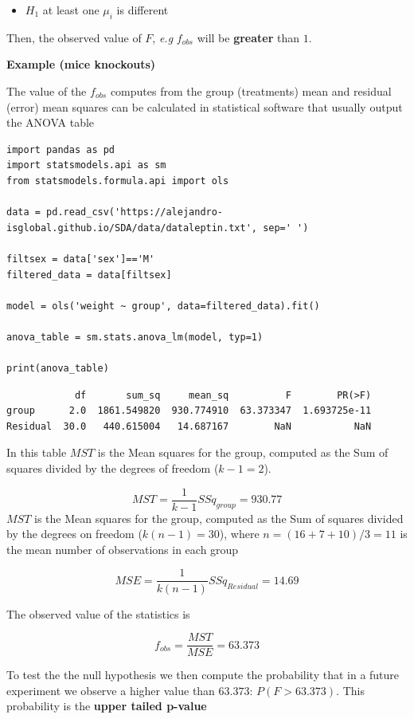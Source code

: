 \documentclass[
]{book}
\providecommand{\tightlist}{%
  \setlength{\itemsep}{0pt}\setlength{\parskip}{0pt}}
\begin{document}
\begin{itemize}
\tightlist
\item
  \(H_1\) at least one \(\mu_i\) is different
\end{itemize}

Then, the observed value of \(F\), \emph{e.g} \(f_{obs}\) will be \textbf{greater} than \(1\).

\textbf{Example (mice knockouts)}

The value of the \(f_{obs}\) computes from the group (treatments) mean and residual (error) mean squares can be calculated in statistical software that usually output the ANOVA table

\begin{verbatim}
import pandas as pd
import statsmodels.api as sm
from statsmodels.formula.api import ols

data = pd.read_csv('https://alejandro-isglobal.github.io/SDA/data/dataleptin.txt', sep=' ')

filtsex = data['sex']=='M'
filtered_data = data[filtsex]

model = ols('weight ~ group', data=filtered_data).fit()

anova_table = sm.stats.anova_lm(model, typ=1)

print(anova_table)
\end{verbatim}

\begin{verbatim}
            df       sum_sq     mean_sq          F        PR(>F)
group      2.0  1861.549820  930.774910  63.373347  1.693725e-11
Residual  30.0   440.615004   14.687167        NaN           NaN
\end{verbatim}

In this table \(MST\) is the Mean squares for the group, computed as the Sum of squares divided by the degrees of freedom (\(k-1=2\)).

\[MST=\frac{1}{k-1}SSq_{group}=930.77\]
\(MST\) is the Mean squares for the group, computed as the Sum of squares divided by the degrees on freedom (\(k(n-1)=30\)), where \(n=(16 + 7 + 10)/3=11\) is the mean number of observations in each group

\[MSE=\frac{1}{k(n-1)}SSq_{Residual}=14.69\]

The observed value of the statistics is

\[f_{obs}=\frac{MST}{MSE}=63.373\]

To test the the null hypothesis we then compute the probability that in a future experiment we observe a higher value than \(63.373\): \(P(F>63.373)\). This probability is the \textbf{upper tailed p-value}
\end{document}

